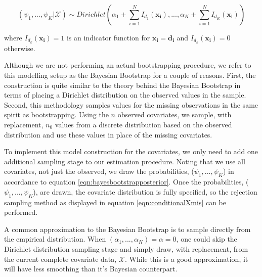 \documentclass[
  12pt,
]{article}
\begin{document}
\begin{equation}
\label{eqn:bayesbootstrapposterior}
(\psi_1, ..., \psi_K|\mathcal{X}) \sim Dirichlet(\alpha_1+\sum_{i=1}^N I_{d_1}(\boldsymbol{x_i}),...,\alpha_K+\sum_{i=1}^N I_{d_K}(\boldsymbol{x_i}))
\end{equation}

where \(I_{d_k}(\boldsymbol{x_i})=1\) is an indicator function for
\(\boldsymbol{x_i} = \boldsymbol{d_i}\) and
\(I_{d_k}(\boldsymbol{x_i})=0\) otherwise.

Although we are not performing an actual bootstrapping procedure, we
refer to this modelling setup as the Bayesian Bootstrap
\citep{rubin_bayesian_1981} for a couple of reasons. First, the
construction is quite similar to the theory behind the Bayesian
Bootstrap in terms of placing a Dirichlet distribution on the observed
values in the sample. Second, this methodology samples values for the
missing observations in the same spirit as bootstrapping. Using the
\(n\) observed covariates, we sample, with replacement, \(n_0\) values
from a discrete distribution based on the observed distribution and use
these values in place of the missing covariates.

To implement this model construction for the covariates, we only need to
add one additional sampling stage to our estimation procedure. Noting
that we use all covariates, not just the observed, we draw the
probabilities, (\(\psi_1, ..., \psi_K\)) in accordance to equation
\ref{eqn:bayesbootstrapposterior}. Once the probabilities,
(\(\psi_1, ..., \psi_K\)), are drawn, the covariate distribution is
fully specified, so the rejection sampling method as displayed in
equation \ref{eqn:conditionalXmis} can be performed.

A common approximation to the Bayesian Bootstrap is to sample directly
from the empirical distribution. When
\((\alpha_1, ..., \alpha_K) = \alpha = 0\), one could skip the Dirichlet
distribution sampling stage and simply draw, with replacement, from the
current complete covariate data, \(\mathcal{X}\). While this is a good
approximation, it will have less smoothing than it's Bayesian
counterpart.
\end{document}

